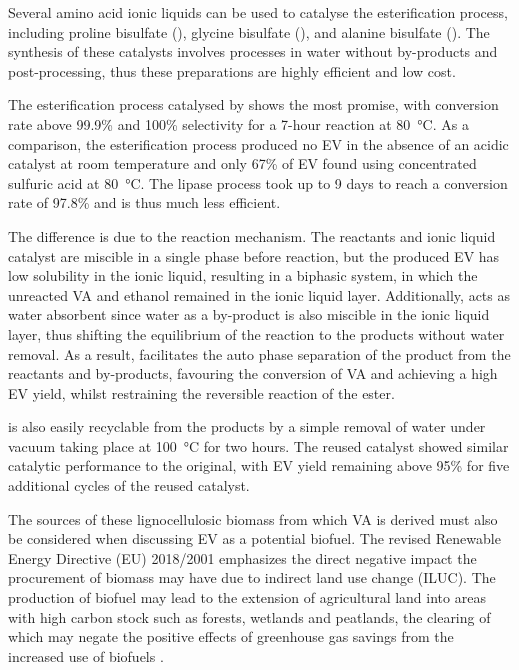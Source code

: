 Several amino acid ionic liquids can be used to catalyse the esterification process, including proline bisulfate (), glycine bisulfate (), and alanine bisulfate (). The synthesis of these catalysts involves processes in water without by-products and post-processing, thus these preparations are highly efficient and low cost.

The esterification process catalysed by  shows the most promise, with conversion rate above 99.9\% and 100\% selectivity for a 7-hour reaction at \SI{80}{\celsius}. As a comparison, the esterification process produced no EV in the absence of an acidic catalyst at room temperature and only 67\% of EV found using concentrated sulfuric acid at \SI{80}{\celsius}. The lipase process took up to 9 days to reach a conversion rate of 97.8\% and is thus much less efficient.

The difference is due to the reaction mechanism. The reactants and ionic liquid catalyst are miscible in a single phase before reaction, but the produced EV has low solubility in the ionic liquid, resulting in a biphasic system, in which the unreacted VA and ethanol remained in the ionic liquid layer. Additionally,  acts as water absorbent since water as a by-product is also miscible in the ionic liquid layer, thus shifting the equilibrium of the reaction to the products without water removal. As a result,  facilitates the auto phase separation of the product from the reactants and by-products, favouring the conversion of VA and achieving a high EV yield, whilst restraining the reversible reaction of the ester.

 is also easily recyclable from the products by a simple removal of water under vacuum taking place at \SI{100}{\celsius} for two hours. The reused catalyst showed similar catalytic performance to the original, with EV yield remaining above 95\% for five additional cycles of the reused catalyst.

The sources of these lignocellulosic biomass from which VA is derived must also be considered when discussing EV as a potential biofuel. The revised Renewable Energy Directive (EU) 2018/2001 emphasizes the direct negative impact the procurement of biomass may have due to indirect land use change (ILUC). The production of biofuel may lead to the extension of agricultural land into areas with high carbon stock such as forests, wetlands and peatlands, the clearing of which may negate the positive effects of greenhouse gas savings from the increased use of biofuels \cite{q7-r2}.

